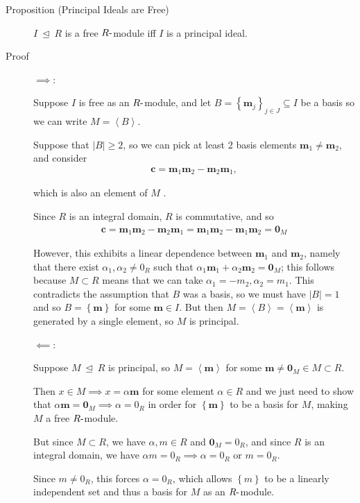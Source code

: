 \begin{description}
\item[Proposition (Principal Ideals are Free)]
\(I {~\trianglelefteq~}R\) is a free \(R{\hbox{-}}\)module iff \(I\) is
a principal ideal.
\item[Proof]
\(\implies\):

Suppose \(I\) is free as an \(R{\hbox{-}}\)module, and let
\(B = \left\{{\mathbf{m}_j}\right\}_{j\in J} \subseteq I\) be a basis so
we can write \(M = \left\langle{B}\right\rangle\).

Suppose that \({\left\lvert {B} \right\rvert} \geq 2\), so we can pick
at least 2 basis elements \(\mathbf{m}_1\neq \mathbf{m}_2\), and
consider
\begin{align*}
\mathbf{c} = \mathbf{m}_1 \mathbf{m}_2 - \mathbf{m}_2 \mathbf{m}_1,
\end{align*}

which is also an element of \(M\) .

Since \(R\) is an integral domain, \(R\) is commutative, and so
\begin{align*}
\mathbf{c} = \mathbf{m}_1 \mathbf{m}_2 - \mathbf{m}_2 \mathbf{m}_1 = \mathbf{m}_1 \mathbf{m}_2 - \mathbf{m}_1 \mathbf{m}_2 = \mathbf{0}_M
\end{align*}

However, this exhibits a linear dependence between \(\mathbf{m}_1\) and
\(\mathbf{m}_2\), namely that there exist
\(\alpha_1, \alpha_2 \neq 0_R\) such that
\(\alpha_1 \mathbf{m}_1 + \alpha_2 \mathbf{m}_2 = \mathbf{0}_M\); this
follows because \(M \subset R\) means that we can take
\(\alpha_1 = -m_2, \alpha_2 = m_1\). This contradicts the assumption
that \(B\) was a basis, so we must have
\({\left\lvert {B} \right\rvert} = 1\) and so
\(B = \left\{{\mathbf{m}}\right\}\) for some \(\mathbf{m} \in I\). But
then
\(M = \left\langle{B}\right\rangle = \left\langle{\mathbf{m}}\right\rangle\)
is generated by a single element, so \(M\) is principal.

\(\impliedby\):

Suppose \(M{~\trianglelefteq~}R\) is principal, so
\(M = \left\langle{\mathbf{m}}\right\rangle\) for some
\(\mathbf{m} \neq \mathbf{0}_M \in M \subset R\).

Then \(x\in M \implies x = \alpha\mathbf{m}\) for some element
\(\alpha\in R\) and we just need to show that
\(\alpha\mathbf{m} = \mathbf{0}_M \implies \alpha = 0_R\) in order for
\(\left\{{\mathbf{m}}\right\}\) to be a basis for \(M\), making \(M\) a
free \(R{\hbox{-}}\)module.

But since \(M \subset R\), we have \(\alpha, m \in R\) and
\(\mathbf{0}_M = 0_R\), and since \(R\) is an integral domain, we have
\(\alpha m = 0_R \implies \alpha = 0_R\) or \(m = 0_R\).

Since \(m \neq 0_R\), this forces \(\alpha = 0_R\), which allows
\(\left\{{m}\right\}\) to be a linearly independent set and thus a basis
for \(M\) as an \(R{\hbox{-}}\)module.
\end{description}

